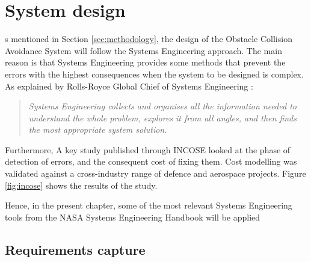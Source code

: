 
\let\textcircled=\pgftextcircled
\chapter{System design}

s mentioned in Section \ref{sec:methodology}, the design of the Obstacle Collision Avoidance System will follow the Systems Engineering approach.
The main reason is that Systems Engineering provides some methods that prevent the errors with the highest consequences when the system to be designed is complex.
As explained by Rolls-Royce Global Chief of Systems Engineering \cite{beasley2015}:
\begin{quote}
	\itshape
	Systems Engineering collects and organises all the information needed to understand the whole problem, explores it from all angles, and then finds the most appropriate system solution.
\end{quote}

Furthermore, A key study published through INCOSE \cite{incoseuk2016} looked at the phase of detection of errors, and the consequent cost of fixing them.
Cost modelling was validated against a cross-industry range of defence and aerospace projects.
Figure \ref{fig:incose} shows the results of the study.



Hence, in the present chapter, some of the most relevant Systems Engineering tools from the NASA Systems Engineering Handbook \cite{nationalaeronauticsandspaceadministration2007} will be applied


\section{Requirements capture}

